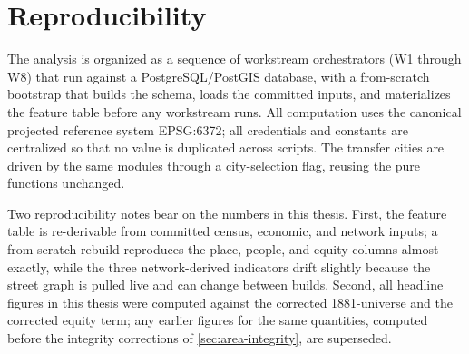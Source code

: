 \section{Reproducibility}
\label{app:reproducibility}

The analysis is organized as a sequence of workstream orchestrators (W1 through W8) that
run against a PostgreSQL/PostGIS database, with a from-scratch bootstrap that builds the
schema, loads the committed inputs, and materializes the feature table before any
workstream runs. All computation uses the canonical projected reference system
EPSG:6372; all credentials and constants are centralized so that no value is duplicated
across scripts. The transfer cities are driven by the same modules through a
city-selection flag, reusing the pure \zmg functions unchanged.

Two reproducibility notes bear on the numbers in this thesis. First, the feature table is
re-derivable from committed census, economic, and network inputs; a from-scratch rebuild
reproduces the place, people, and equity columns almost exactly, while the three
network-derived indicators drift slightly because the street graph is pulled live and can
change between builds. Second, all headline figures in this thesis were computed against
the corrected \num{1881}-\ageb universe and the corrected equity term; any earlier figures
for the same quantities, computed before the integrity corrections of
\cref{sec:area-integrity}, are superseded.
